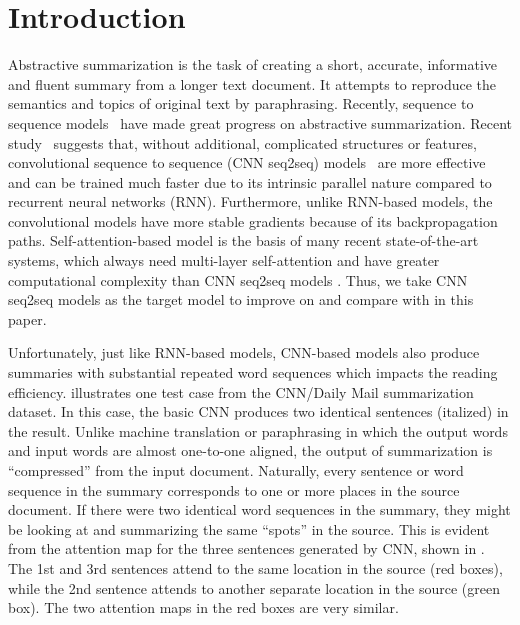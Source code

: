 \section{Introduction}
\label{sec:intro}

Abstractive summarization is the task of creating a short, accurate,
informative and fluent summary from a longer text document.
It attempts to reproduce the semantics and topics of original text
by paraphrasing. 
Recently, sequence to sequence
models~\citep{RushCW15,ChopraAR16,NallapatiZSGX16,SeeLM17,PaulusXS17}
have made great progress on abstractive summarization.
Recent study~\citep{bai2018empirical} suggests that, 
without additional, complicated structures or features,
convolutional sequence to sequence 
(CNN seq2seq) models~\citep{gehring2017convs2s,FanGA18,LiuLZ18} 
are more effective and can be trained much faster due to 
its intrinsic parallel nature compared to recurrent neural networks (RNN).
Furthermore, unlike RNN-based models, 
the convolutional models have more stable gradients 
because of its backpropagation paths. 
Self-attention-based model is 
the basis of many recent state-of-the-art systems,
which always need multi-layer self-attention and have greater computational complexity than CNN seq2seq models \citep{CompareTrans}.
Thus, we take CNN seq2seq models as the target model to improve on and
compare with in this paper.

Unfortunately, just like RNN-based models, CNN-based models also produce
summaries with substantial repeated word sequences which impacts the reading efficiency.
 illustrates one 
test case from the CNN/Daily Mail summarization dataset. 
In this case, the basic CNN produces two 
identical sentences (italized) in the result. 
Unlike machine translation or paraphrasing in which the output words
and input words are almost one-to-one aligned, the output of summarization
is ``compressed'' from the input document. Naturally, every sentence or 
word sequence in the summary corresponds to one or more places in the source
document. If there were two identical word sequences in the summary,
they might be looking at and summarizing the same ``spots'' in the source.
This is evident from the attention map for the three sentences generated by 
CNN, shown in . The 1st and 3rd sentences attend to
the same location in the source (red boxes), 
while the 2nd sentence attends to another separate location in the source (green box). 
The two attention maps in the red boxes are very similar.

